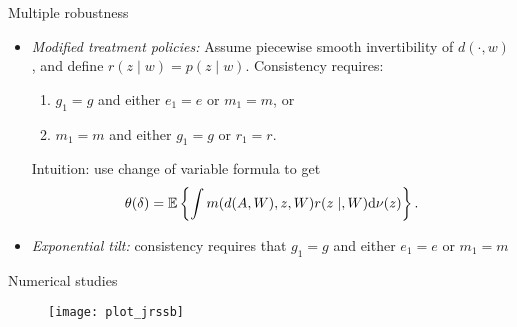 \documentclass{beamer}
\begin{document}

\begin{frame}{Multiple robustness}
  \begin{itemize}
  \item \textit{Modified treatment policies:} Assume piecewise smooth
    invertibility of $d(\cdot, w)$, and define $r(z\mid w) = p(z\mid w)$.
    Consistency requires:
    \begin{enumerate}
      \item $g_1=g$ and either $e_1=e$ or $m_1=m$, or
      \item $m_1=m$ and either $g_1=g$ or $r_1=r$.
    \end{enumerate}
    Intuition: use change of variable formula to get
    \[\theta(\delta) = \mathbb{E}\left\{\int m(d(A,W),z,W)r(z \mid,
        W)\mathrm{d}\nu(z)\right\}.\]
  \item \textit{Exponential tilt:} consistency requires that $g_1 = g$ and
    either $e_1 = e$ or $m_1 = m$
  \end{itemize}

\note{
}

\end{frame}


\begin{frame}{Numerical studies}
  \begin{figure}[H]
    \hspace*{-1.5cm}
    \centering
    \texttt{[image: plot\_jrssb]}
  \end{figure}

\note{
}

\end{frame}

\end{document}
